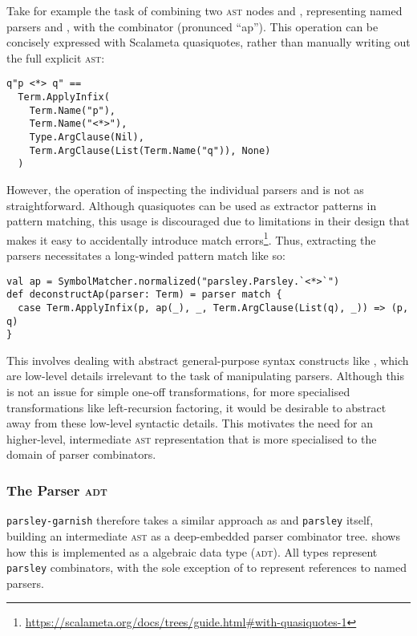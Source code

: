 \documentclass[../../main.tex]{subfiles}
\begin{document}
Take for example the task of combining two \textsc{ast} nodes  and , representing named parsers  and , with the combinator \scala{<*>} (pronunced ``ap'').
This operation can be concisely expressed with Scalameta quasiquotes, rather than manually writing out the full explicit \textsc{ast}:
\begin{verbatim}
q"p <*> q" ==
  Term.ApplyInfix(
    Term.Name("p"),
    Term.Name("<*>"),
    Type.ArgClause(Nil),
    Term.ArgClause(List(Term.Name("q")), None)
  )
\end{verbatim}
However, the  operation of inspecting the individual parsers  and  is not as straightforward.
Although quasiquotes can be used as extractor patterns in pattern matching, this usage is discouraged due to limitations in their design that makes it easy to accidentally introduce match errors\footnote{\url{https://scalameta.org/docs/trees/guide.html#with-quasiquotes-1}}.
Thus, extracting the parsers necessitates a long-winded pattern match like so:
\begin{verbatim}
val ap = SymbolMatcher.normalized("parsley.Parsley.`<*>`")
def deconstructAp(parser: Term) = parser match {
  case Term.ApplyInfix(p, ap(_), _, Term.ArgClause(List(q), _)) => (p, q)
}
\end{verbatim}
This involves dealing with abstract general-purpose syntax constructs like , which are low-level details irrelevant to the task of manipulating parsers.
Although this is not an issue for simple one-off transformations, for more specialised transformations like left-recursion factoring, it would be desirable to abstract away from these low-level syntactic details.
This motivates the need for an higher-level, intermediate \textsc{ast} representation that is more specialised to the domain of parser combinators.

\subsubsection{The Parser \textsc{adt}}
\texttt{parsley-garnish} therefore takes a similar approach as \textcite{baars_leftrec_2004} and \texttt{parsley} itself, building an intermediate \textsc{ast} as a deep-embedded parser combinator tree.
 shows how this is implemented as a  algebraic data type (\textsc{adt}).
All  types represent \texttt{parsley} combinators, with the sole exception of  to represent references to named parsers.
\end{document}
